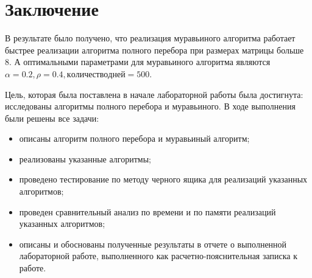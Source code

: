 \chapter*{Заключение}

В результате было получено, что реализация муравьиного алгоритма работает быстрее реализации алгоритма полного перебора при размерах матрицы больше 8. А оптимальными параметрами для муравьиного алгоритма являются $\alpha = 0.2, \rho = 0.4, количество дней = 500$.

Цель, которая была поставлена в начале лабораторной работы была достигнута: исследованы алгоритмы полного перебора и муравьиного. В ходе выполнения были решены все задачи:

\begin{itemize}[label=---]
	\item описаны алгоритм полного перебора и муравьиный алгоритм;
	
	\item реализованы указанные алгоритмы;
	
	\item проведено тестирование по методу черного ящика для реализаций указанных алгоритмов;
	
	\item проведен сравнительный анализ по времени и по памяти реализаций указанных алгоритмов;
	
	\item описаны и обоснованы полученные результаты в отчете о выполненной лабораторной работе, выполненного как расчетно-пояснительная записка к работе.
\end{itemize}
